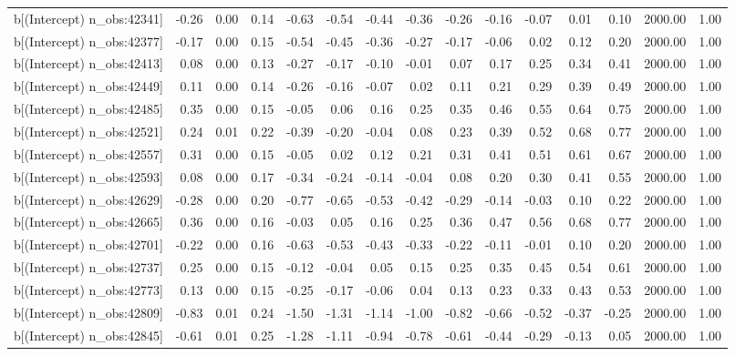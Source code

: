 \begin{table}[ht]
\begin{tabular}{rrrrrrrrrrrrrrr}
  b[(Intercept) n\_obs:42341] & -0.26 & 0.00 & 0.14 & -0.63 & -0.54 & -0.44 & -0.36 & -0.26 & -0.16 & -0.07 & 0.01 & 0.10 & 2000.00 & 1.00 \\ 
  b[(Intercept) n\_obs:42377] & -0.17 & 0.00 & 0.15 & -0.54 & -0.45 & -0.36 & -0.27 & -0.17 & -0.06 & 0.02 & 0.12 & 0.20 & 2000.00 & 1.00 \\ 
  b[(Intercept) n\_obs:42413] & 0.08 & 0.00 & 0.13 & -0.27 & -0.17 & -0.10 & -0.01 & 0.07 & 0.17 & 0.25 & 0.34 & 0.41 & 2000.00 & 1.00 \\ 
  b[(Intercept) n\_obs:42449] & 0.11 & 0.00 & 0.14 & -0.26 & -0.16 & -0.07 & 0.02 & 0.11 & 0.21 & 0.29 & 0.39 & 0.49 & 2000.00 & 1.00 \\ 
  b[(Intercept) n\_obs:42485] & 0.35 & 0.00 & 0.15 & -0.05 & 0.06 & 0.16 & 0.25 & 0.35 & 0.46 & 0.55 & 0.64 & 0.75 & 2000.00 & 1.00 \\ 
  b[(Intercept) n\_obs:42521] & 0.24 & 0.01 & 0.22 & -0.39 & -0.20 & -0.04 & 0.08 & 0.23 & 0.39 & 0.52 & 0.68 & 0.77 & 2000.00 & 1.00 \\ 
  b[(Intercept) n\_obs:42557] & 0.31 & 0.00 & 0.15 & -0.05 & 0.02 & 0.12 & 0.21 & 0.31 & 0.41 & 0.51 & 0.61 & 0.67 & 2000.00 & 1.00 \\ 
  b[(Intercept) n\_obs:42593] & 0.08 & 0.00 & 0.17 & -0.34 & -0.24 & -0.14 & -0.04 & 0.08 & 0.20 & 0.30 & 0.41 & 0.55 & 2000.00 & 1.00 \\ 
  b[(Intercept) n\_obs:42629] & -0.28 & 0.00 & 0.20 & -0.77 & -0.65 & -0.53 & -0.42 & -0.29 & -0.14 & -0.03 & 0.10 & 0.22 & 2000.00 & 1.00 \\ 
  b[(Intercept) n\_obs:42665] & 0.36 & 0.00 & 0.16 & -0.03 & 0.05 & 0.16 & 0.25 & 0.36 & 0.47 & 0.56 & 0.68 & 0.77 & 2000.00 & 1.00 \\ 
  b[(Intercept) n\_obs:42701] & -0.22 & 0.00 & 0.16 & -0.63 & -0.53 & -0.43 & -0.33 & -0.22 & -0.11 & -0.01 & 0.10 & 0.20 & 2000.00 & 1.00 \\ 
  b[(Intercept) n\_obs:42737] & 0.25 & 0.00 & 0.15 & -0.12 & -0.04 & 0.05 & 0.15 & 0.25 & 0.35 & 0.45 & 0.54 & 0.61 & 2000.00 & 1.00 \\ 
  b[(Intercept) n\_obs:42773] & 0.13 & 0.00 & 0.15 & -0.25 & -0.17 & -0.06 & 0.04 & 0.13 & 0.23 & 0.33 & 0.43 & 0.53 & 2000.00 & 1.00 \\ 
  b[(Intercept) n\_obs:42809] & -0.83 & 0.01 & 0.24 & -1.50 & -1.31 & -1.14 & -1.00 & -0.82 & -0.66 & -0.52 & -0.37 & -0.25 & 2000.00 & 1.00 \\ 
  b[(Intercept) n\_obs:42845] & -0.61 & 0.01 & 0.25 & -1.28 & -1.11 & -0.94 & -0.78 & -0.61 & -0.44 & -0.29 & -0.13 & 0.05 & 2000.00 & 1.00 \\ 

\end{tabular}
\end{table}

